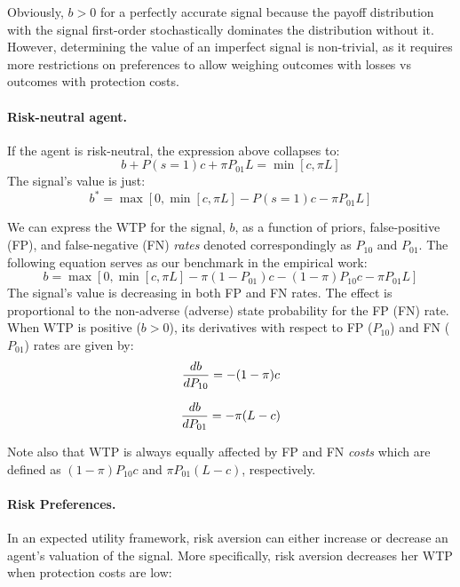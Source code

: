 \documentclass[12pt,a4paper]{article}
\begin{document}
Obviously, $b>0$ for a perfectly accurate signal because the payoff distribution with the signal first-order stochastically dominates the distribution without it. However, determining the value of an imperfect signal is non-trivial, as it requires more restrictions on preferences to allow weighing outcomes with losses vs outcomes with protection costs.


\paragraph{Risk-neutral agent.} If the agent is risk-neutral, the expression above collapses to:
\[b+P(s=1)c+\pi P_{01}L=\min[c,\pi L]
\]
The signal's value is just:
\[
b^*=\max[0,\min[c,\pi L]-P(s=1)c-\pi P_{01}L]
\]

We can express the WTP for the signal, $b$, as a function of priors, false-positive (FP), and false-negative (FN) \textit{rates}  denoted correspondingly as $P_{10}$ and $P_{01}$. The following equation serves as our benchmark in the empirical work:
\begin{equation}\label{eq:rnWTP}
b=\max[0,\min[c,\pi L]-\pi (1-P_{01})c-(1-\pi)P_{10}c-\pi P_{01}L]
\end{equation}
The signal's value is decreasing in both FP and FN rates. The effect is proportional to the non-adverse (adverse) state probability for the FP (FN) rate. When WTP is positive ($b>0$),  its derivatives with respect to FP ($P_{10}$) and FN ($P_{01}$) rates are given by:
\begin{equation}\label{eq:dWTP_dFP}
{db\over dP_{10}}=-(1-\pi)c
\end{equation}

\begin{equation}\label{eq:dWTP_dFN}
{db\over dP_{01}}=-\pi(L-c)
\end{equation}
\vspace{10pt}

Note also that WTP is always equally affected by FP and FN \textit{costs} which are defined as $(1-\pi) P_{10} c$ and $\pi P_{01}(L-c)$, respectively.

\paragraph{Risk Preferences.} In an expected utility framework, risk aversion can either increase or decrease an agent's valuation of the signal. More specifically, risk aversion decreases her WTP when protection costs are low: 
\end{document}
